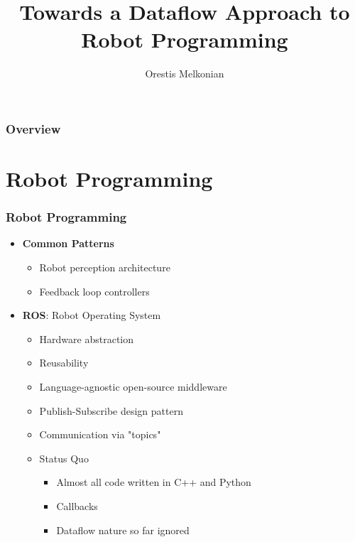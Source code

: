 \documentclass{beamer}
\title{Towards a Dataflow Approach to \\ Robot Programming}
\author{Orestis Melkonian}
\institute[UoA] {
	Software \& Knowledge Engineering Laboratory (SKEL)\\
	\medskip
	\textit{NCSR "Demokritos"} 
}
\date{}
\begin{document}
\begin{frame} \titlepage \end{frame}

\begin{frame} \frametitle{Overview} \tableofcontents \end{frame}
\section{Robot Programming}
	\begin{frame} \frametitle{Robot Programming}
		\begin{itemize}
		\item \textbf{Common Patterns}
			\begin{itemize}
			\item Robot perception architecture
			\item Feedback loop controllers
			\end{itemize}
		\end{itemize}		
		\begin{itemize}
		\item \textbf{ROS}: Robot Operating System
			\begin{itemize}
			\item Hardware abstraction
			\item Reusability
			\item Language-agnostic open-source middleware
			\item Publish-Subscribe design pattern
			\item Communication via "topics"
			\item Status Quo
				\begin{itemize}
				\item Almost all code written in C++ and Python
				\item Callbacks			
				\item Dataflow nature so far ignored
				\end{itemize}					
			\end{itemize}
		\end{itemize}		
	\end{frame}
\end{document}

